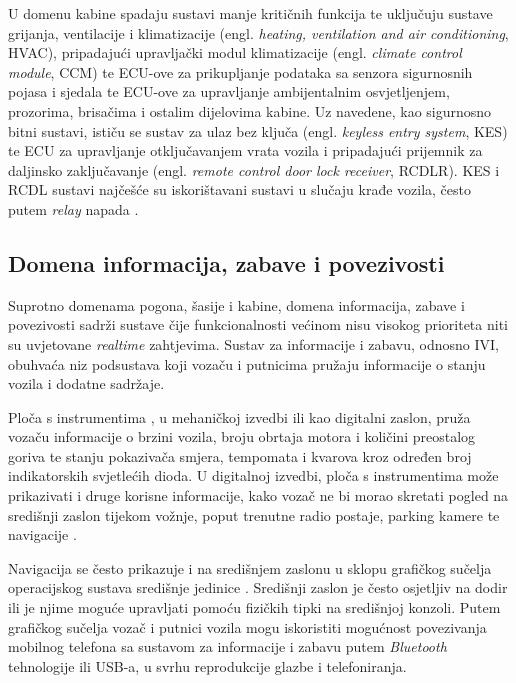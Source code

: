 \documentclass[times, utf8, diplomski, numeric]{fer}
\begin{document}
U domenu kabine spadaju sustavi manje kritičnih funkcija te uključuju sustave grijanja, ventilacije i klimatizacije (engl. \textit{heating, ventilation and air conditioning}, HVAC), pripadajući upravljački modul klimatizacije (engl. \textit{climate control module}, CCM) te ECU-ove za prikupljanje podataka sa senzora sigurnosnih pojasa i sjedala te ECU-ove za upravljanje ambijentalnim osvjetljenjem, prozorima, brisačima i ostalim dijelovima kabine. Uz navedene, kao sigurnosno bitni sustavi, ističu se sustav za ulaz bez ključa (engl. \textit{keyless entry system}, KES) te ECU za upravljanje otključavanjem vrata vozila i pripadajući prijemnik za daljinsko zaključavanje (engl. \textit{remote control door lock receiver}, RCDLR). KES i RCDL sustavi najčešće su iskorištavani sustavi u slučaju krađe vozila, često putem \textit{relay} napada \cite{nasser2023automotive, cbc2020relay}.

\subsection{Domena informacija, zabave i povezivosti}
Suprotno domenama pogona, šasije i kabine, domena informacija, zabave i povezivosti sadrži sustave čije funkcionalnosti većinom nisu visokog prioriteta niti su uvjetovane \textit{realtime} zahtjevima. Sustav za informacije i zabavu, odnosno IVI, obuhvaća niz podsustava koji vozaču i putnicima pružaju informacije o stanju vozila i dodatne sadržaje. 

Ploča s instrumentima , u mehaničkoj izvedbi ili kao digitalni zaslon, pruža vozaču informacije o brzini vozila, broju obrtaja motora i količini preostalog goriva te stanju pokazivača smjera, tempomata i kvarova kroz određen broj indikatorskih svjetlećih dioda. U digitalnoj izvedbi, ploča s instrumentima može prikazivati i druge korisne informacije, kako vozač ne bi morao skretati pogled na središnji zaslon tijekom vožnje, poput trenutne radio postaje, parking kamere te navigacije \cite{bosch2022handbook, nasser2023automotive}. 

Navigacija se često prikazuje i na središnjem zaslonu u sklopu grafičkog sučelja operacijskog sustava središnje jedinice . Središnji zaslon je često osjetljiv na dodir ili je njime moguće upravljati pomoću fizičkih tipki na središnjoj konzoli. Putem grafičkog sučelja vozač i putnici vozila mogu iskoristiti mogućnost povezivanja mobilnog telefona sa sustavom za informacije i zabavu putem \textit{Bluetooth} tehnologije ili USB-a, u svrhu reprodukcije glazbe i telefoniranja.
\end{document}
